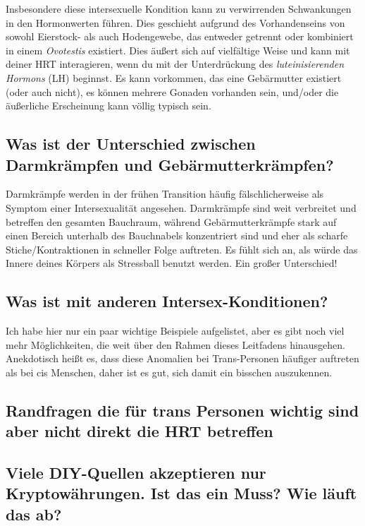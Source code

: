 \documentclass{article}
\begin{document}
Insbesondere diese intersexuelle Kondition kann zu verwirrenden Schwankungen in den Hormonwerten führen. Dies geschieht aufgrund des Vorhandenseins von sowohl Eierstock- als auch Hodengewebe, das entweder getrennt oder kombiniert in einem \textit{Ovotestis} existiert. Dies äußert sich auf vielfältige Weise und kann mit deiner HRT interagieren, wenn du mit der Unterdrückung des \textit{luteinisierenden Hormons} (LH) beginnst. Es kann vorkommen, das eine Gebärmutter existiert (oder auch nicht), es können mehrere Gonaden vorhanden sein, und/oder die äußerliche Erscheinung kann völlig typisch sein.

\subsection{Was ist der Unterschied zwischen Darmkrämpfen und Gebärmutterkrämpfen?}\label{11-35}

Darmkrämpfe werden in der frühen Transition häufig fälschlicherweise als Symptom einer Intersexualität angesehen. Darmkrämpfe sind weit verbreitet und betreffen den gesamten Bauchraum, während Gebärmutterkrämpfe stark auf einen Bereich unterhalb des Bauchnabels konzentriert sind und eher als scharfe Stiche/Kontraktionen in schneller Folge auftreten. Es fühlt sich an, als würde das Innere deines Körpers als Stressball benutzt werden. Ein großer Unterschied!

\subsection{Was ist mit anderen Intersex-Konditionen?}

Ich habe hier nur ein paar wichtige Beispiele aufgelistet, aber es gibt noch viel mehr Möglichkeiten, die weit über den Rahmen dieses Leitfadens hinausgehen. Anekdotisch heißt es, dass diese Anomalien bei Trans-Personen häufiger auftreten als bei cis Menschen, daher ist es gut, sich damit ein bisschen auszukennen.

\subsection*{Randfragen die für trans Personen wichtig sind aber nicht direkt die HRT betreffen}

\subsection{Viele DIY-Quellen akzeptieren nur Kryptowährungen. Ist das ein Muss? Wie läuft das ab?}
\end{document}
